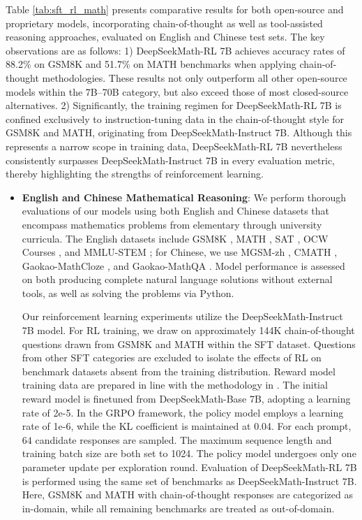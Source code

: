 {Table \ref{tab:sft_rl_math} presents comparative results for both open-source and proprietary models, incorporating chain-of-thought as well as tool-assisted reasoning approaches, evaluated on English and Chinese test sets. The key observations are as follows: 1) DeepSeekMath-RL 7B achieves accuracy rates of 88.2\% on GSM8K and 51.7\% on MATH benchmarks when applying chain-of-thought methodologies. These results not only outperform all other open-source models within the 7B–70B category, but also exceed those of most closed-source alternatives. 2) Significantly, the training regimen for DeepSeekMath-RL 7B is confined exclusively to instruction-tuning data in the chain-of-thought style for GSM8K and MATH, originating from DeepSeekMath-Instruct 7B. Although this represents a narrow scope in training data, DeepSeekMath-RL 7B nevertheless consistently surpasses DeepSeekMath-Instruct 7B in every evaluation metric, thereby highlighting the strengths of reinforcement learning.

\begin{itemize}[topsep=0pt]
    \item \textbf{English and Chinese Mathematical Reasoning}: We perform thorough evaluations of our models using both English and Chinese datasets that encompass mathematics problems from elementary through university curricula. The English datasets include GSM8K \citep{gsm8k}, MATH \citep{MATH}, SAT \citep{llemma}, OCW Courses \citep{minerva}, and MMLU-STEM \citep{mmlu}; for Chinese, we use MGSM-zh \citep{mgsm}, CMATH \citep{wei2023cmath}, Gaokao-MathCloze \citep{agieval}, and Gaokao-MathQA \citep{agieval}. Model performance is assessed on both producing complete natural language solutions without external tools, as well as solving the problems via Python.

Our reinforcement learning experiments utilize the DeepSeekMath-Instruct 7B model. For RL training, we draw on approximately 144K chain-of-thought questions drawn from GSM8K and MATH within the SFT dataset. Questions from other SFT categories are excluded to isolate the effects of RL on benchmark datasets absent from the training distribution. Reward model training data are prepared in line with the methodology in \citep{wang2023math}. The initial reward model is finetuned from DeepSeekMath-Base 7B, adopting a learning rate of 2e-5. In the GRPO framework, the policy model employs a learning rate of 1e-6, while the KL coefficient is maintained at 0.04. For each prompt, $64$ candidate responses are sampled. The maximum sequence length and training batch size are both set to 1024. The policy model undergoes only one parameter update per exploration round. Evaluation of DeepSeekMath-RL 7B is performed using the same set of benchmarks as DeepSeekMath-Instruct 7B. Here, GSM8K and MATH with chain-of-thought responses are categorized as in-domain, while all remaining benchmarks are treated as out-of-domain.


\end{itemize}}
